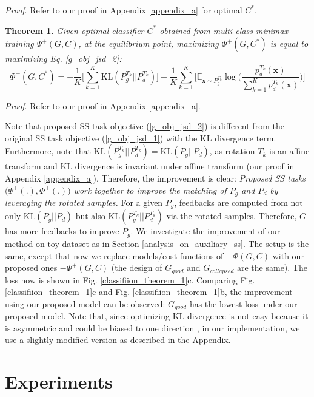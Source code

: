 \documentclass{article}
\newtheorem{theorem}{Theorem}
\begin{document}
\noindent \textit{Proof}. Refer to our proof in Appendix \ref{appendix_a} for optimal $C^*$.

\begin{theorem}
Given optimal classifier $C^*$ obtained from multi-class minimax training $\Psi^+(G,C)$, at the equilibrium point, maximizing $\Phi^+(G,C^*)$ is equal to maximizing Eq. \ref{g_obj_jsd_2}:
\begin{equation}
\Phi^+(G,C^*) = - \frac{1}{K}\bigg[\sum_{k=1}^{K}\mathrm{KL}(P_g^{T_k}||P_d^{T_k})\bigg] + \frac{1}{K}\sum_{k=1}^{K}\bigg[\mathbb{E}_{\mathbf{x} \sim {P_g^{T_k}}}\log\Big(\frac{p_d^{T_k}(\mathbf{x})}{\sum_{k=1}^{K}p_d^{T_k}(\mathbf{x})}\Big)\bigg]
\label{g_obj_jsd_2}
\end{equation}
\label{theorem_2}
\end{theorem}

\noindent \textit{Proof}. Refer to our proof in Appendix \ref{appendix_a}.


Note that proposed SS task objective (\ref{g_obj_jsd_2}) is different from the original SS task objective (\ref{g_obj_jsd_1}) with the KL divergence term.
Furthermore, note that $\mathrm{KL}(P_g^{T_k}||P_d^{T_k}) = \mathrm{KL}(P_g||P_d)$, as rotation $T_k$ is an affine transform and KL divergence is invariant under affine transform (our proof in Appendix \ref{appendix_a}).
Therefore, the improvement is clear: {\em Proposed SS tasks $\Big(\Psi^+(.), \Phi^+(.)\Big)$ work together to improve the matching of $P_g$ and $P_d$ by leveraging the rotated samples.} For a given $P_g$, feedbacks are computed from not only  $\mathrm{KL}(P_g||P_d)$ but also $\mathrm{KL}(P_g^{T_k}||P_d^{T_k})$ via the rotated samples. Therefore, $G$ has more feedbacks to improve $P_g$. We investigate the improvement of our method on toy dataset as in Section \ref{analysis_on_auxiliary_ss}. The setup is the same, except that now we replace models/cost functions of $-\Phi(G,C)$ with our proposed ones $-\Phi^+(G,C)$ (the design of $G_{good}$ and $G_{collapsed}$ are the same). The loss now is shown in Fig. \ref{classifiion_theorem_1}c. Comparing Fig. \ref{classifiion_theorem_1}c and Fig. \ref{classifiion_theorem_1}b, the improvement using our proposed model can be observed: $G_{good}$ has the lowest loss under our proposed model. Note that, since optimizing KL divergence is not easy because it is asymmetric and could be biased to one direction \cite{tu-nips-2017}, in our implementation, we use a slightly modified version as described in the Appendix.  
\section{Experiments}
\end{document}
